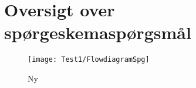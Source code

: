 \chapter{Oversigt over spørgeskemaspørgsmål}
\label{app:FlowdiagramSPG}
%




%
\begin{figure}[H]
	\centering
	\texttt{[image: Test1/FlowdiagramSpg]}
	\caption{Ny}
	\label{fig:FlowdiagramSpg}
\end{figure}
\noindent
%